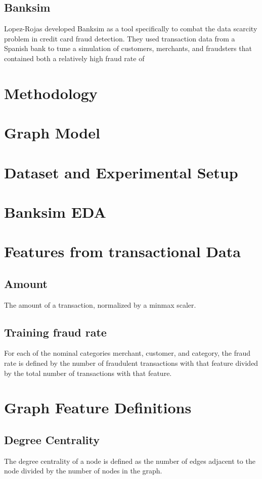 \documentclass{article}
\begin{document}
\subsection{Banksim}
	Lopez-Rojas developed Banksim as a tool specifically to combat the data scarcity problem in credit card fraud detection. They used transaction data from a Spanish bank to tune a simulation of customers, merchants, and fraudsters that contained both a relatively high fraud rate of %

\section{Methodology}                                                                                                         
\section{Graph Model}


\section{Dataset and Experimental Setup}
\section{Banksim EDA}
\section{Features from transactional Data}
\subsection{Amount}
The amount of a transaction, normalized by a minmax scaler. 
\subsection{Training fraud rate}
	For each of the nominal categories merchant, customer, and category, the fraud rate is defined by the number of fraudulent transactions with that feature divided by the total number of transactions with that feature.  
\section{Graph Feature Definitions}
\subsection{Degree Centrality}
	The degree centrality of a node is defined as the number of edges adjacent to the node divided by the number of nodes in the graph. 
\end{document}
